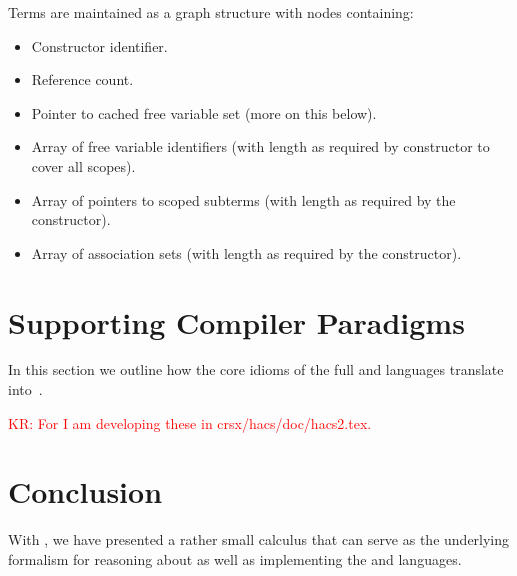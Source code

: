 \documentclass[letterpaper,11pt]{article}
\newcommand{\KR}[1]{\textcolor{red}{KR: #1}}
\begin{document}
\begin{structure}
  Terms are maintained as a graph structure with nodes containing:
  \begin{itemize}
  \item Constructor identifier.
  \item Reference count.
  \item Pointer to cached free variable set (more on this below).
  \item Array of free variable identifiers (with length as required by constructor to cover all
    scopes).
  \item Array of pointers to scoped subterms (with length as required by the constructor).
  \item Array of association sets (with length as required by the constructor).
  \end{itemize}
\end{structure}

\begin{structure}
  
\end{structure}








\section{Supporting Compiler Paradigms}
\label{sec:compiling}

In this section we outline how the core idioms of the full \CRSX and \HAX languages translate
into~\hax.

\KR{For \HAX I am developing these in crsx/hacs/doc/hacs2.tex.}


\section{Conclusion}
\label{sec:conc}

With \hax, we have presented a rather small calculus that can serve as the underlying formalism for
reasoning about as well as implementing the \CRSX and \HAX languages.

\end{document}
